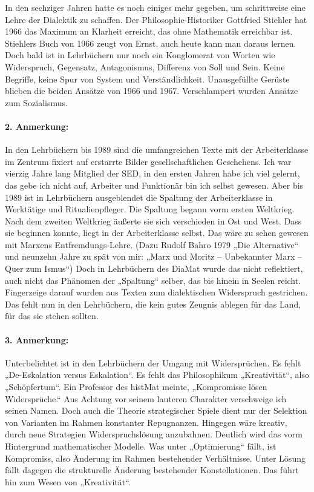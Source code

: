 \documentclass[11pt,a4paper]{article}
\begin{document}
In den sechziger Jahren hatte es noch einiges mehr gegeben, um schrittweise
eine Lehre der Dialektik zu schaffen. Der Philosophie-Historiker Gottfried
Stiehler hat 1966 das Maximum an Klarheit erreicht, das ohne Mathematik
erreichbar ist. Stiehlers Buch von 1966 zeugt von Ernst, auch heute kann man
daraus lernen. Doch bald ist in Lehrbüchern nur noch ein Konglomerat von
Worten wie Widerspruch, Gegensatz, Antagonismus, Differenz von Soll und Sein.
Keine Begriffe, keine Spur von System und Verständlichkeit. Unausgefüllte
Gerüste blieben die beiden Ansätze von 1966 und 1967. Verschlampert wurden
Ansätze zum Sozialismus.

\paragraph{2. Anmerkung:}
In den Lehrbüchern bis 1989 sind die umfangreichen Texte mit der
Arbeiterklasse im Zentrum fixiert auf erstarrte Bilder gesellschaftlichen
Geschehens. Ich war vierzig Jahre lang Mitglied der SED, in den ersten Jahren
habe ich viel gelernt, das gebe ich nicht auf, Arbeiter und Funktionär bin ich
selbst gewesen. Aber bis 1989 ist in Lehrbüchern ausgeblendet die Spaltung der
Arbeiterklasse in Werktätige und Ritualienpfleger. Die Spaltung begann vorm
ersten Weltkrieg. Nach dem zweiten Weltkrieg äußerte sie sich verschieden in
Ost und West. Dass sie beginnen konnte, liegt in der Arbeiterklasse selbst.
Das wäre zu sehen gewesen mit Marxens Entfremdungs-Lehre. (Dazu Rudolf Bahro
1979 „Die Alternative“ und neunzehn Jahre zu spät von mir: „Marx und Moritz –
Unbekannter Marx – Quer zum Ismus“) Doch in Lehrbüchern des DiaMat wurde das
nicht reflektiert, auch nicht das Phänomen der „Spaltung“ selber, das bis
hinein in Seelen reicht. Fingerzeige darauf wurden aus Texten zum
dialektischen Widerspruch gestrichen. Das fehlt nun in den Lehrbüchern, die
kein gutes Zeugnis ablegen für das Land, für das sie stehen sollten.

\paragraph{3. Anmerkung:}
Unterbelichtet ist in den Lehrbüchern der Umgang mit Widersprüchen. Es fehlt
„De-Eskalation versus Eskalation“. Es fehlt das Philosophikum „Kreativität“,
also „Schöpfertum“. Ein Professor des histMat meinte, „Kompromisse lösen
Widersprüche.“ Aus Achtung vor seinem lauteren Charakter verschweige ich
seinen Namen. Doch auch die Theorie strategischer Spiele dient nur der
Selektion von Varianten im Rahmen konstanter Repugnanzen. Hingegen wäre
kreativ, durch neue Strategien Widerspruchslösung anzubahnen. Deutlich wird
das vorm Hintergrund mathematischer Modelle. Was unter „Optimierung“ fällt,
ist Kompromiss, also Änderung im Rahmen bestehender Verhältnisse. Unter Lösung
fällt dagegen die strukturelle Änderung bestehender Konstellationen. Das führt
hin zum Wesen von „Kreativität“.
\end{document}
